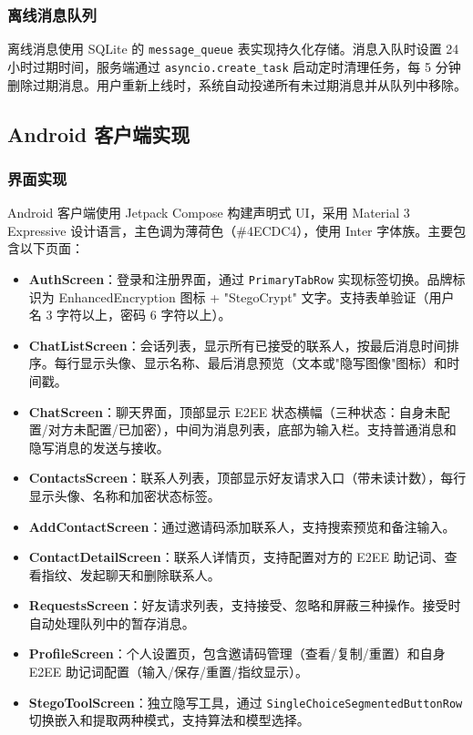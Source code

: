 \subsubsection{离线消息队列}

离线消息使用 SQLite 的 \texttt{message\_queue} 表实现持久化存储。消息入队时设置 24 小时过期时间，服务端通过 \texttt{asyncio.create\_task} 启动定时清理任务，每 5 分钟删除过期消息。用户重新上线时，系统自动投递所有未过期消息并从队列中移除。

\subsection{Android 客户端实现}

\subsubsection{界面实现}

Android 客户端使用 Jetpack Compose 构建声明式 UI，采用 Material 3 Expressive 设计语言，主色调为薄荷色（\#4ECDC4），使用 Inter 字体族。主要包含以下页面：

\begin{itemize}
    \item \textbf{AuthScreen}：登录和注册界面，通过 \texttt{PrimaryTabRow} 实现标签切换。品牌标识为 EnhancedEncryption 图标 + "StegoCrypt" 文字。支持表单验证（用户名 3 字符以上，密码 6 字符以上）。
    \item \textbf{ChatListScreen}：会话列表，显示所有已接受的联系人，按最后消息时间排序。每行显示头像、显示名称、最后消息预览（文本或"隐写图像"图标）和时间戳。
    \item \textbf{ChatScreen}：聊天界面，顶部显示 E2EE 状态横幅（三种状态：自身未配置/对方未配置/已加密），中间为消息列表，底部为输入栏。支持普通消息和隐写消息的发送与接收。
    \item \textbf{ContactsScreen}：联系人列表，顶部显示好友请求入口（带未读计数），每行显示头像、名称和加密状态标签。
    \item \textbf{AddContactScreen}：通过邀请码添加联系人，支持搜索预览和备注输入。
    \item \textbf{ContactDetailScreen}：联系人详情页，支持配置对方的 E2EE 助记词、查看指纹、发起聊天和删除联系人。
    \item \textbf{RequestsScreen}：好友请求列表，支持接受、忽略和屏蔽三种操作。接受时自动处理队列中的暂存消息。
    \item \textbf{ProfileScreen}：个人设置页，包含邀请码管理（查看/复制/重置）和自身 E2EE 助记词配置（输入/保存/重置/指纹显示）。
    \item \textbf{StegoToolScreen}：独立隐写工具，通过 \texttt{SingleChoiceSegmentedButtonRow} 切换嵌入和提取两种模式，支持算法和模型选择。
\end{itemize}


